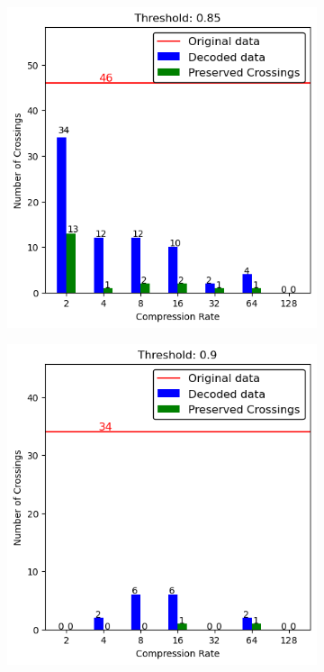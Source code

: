 \begin{appendices}
\begin{figure}
\begin{subfigure}{.5\textwidth}
	\end{subfigure}
	\hfill
	\begin{subfigure}{.5\textwidth}
		\includegraphics[width=\textwidth]{../../Images/spikes_threshold_085.png}
	\end{subfigure}
	\begin{subfigure}{.5\textwidth}
		\includegraphics[width=\textwidth]{../../Images/spikes_threshold_09.png}

\end{subfigure}
\end{figure}
\end{appendices}
